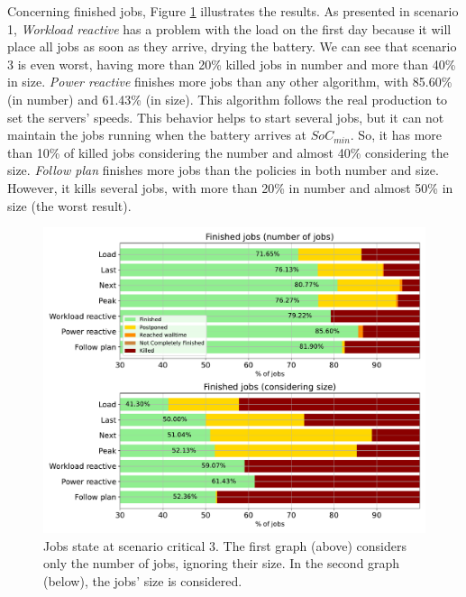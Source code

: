 Concerning finished jobs, Figure \ref{fig:jobs_critical_3} illustrates the results. As presented in scenario 1, \emph{Workload reactive} has a problem with the load on the first day because it will place all jobs as soon as they arrive, drying the battery. We can see that scenario 3 is even worst, having more than 20\% killed jobs in number and more than 40\% in size. \emph{Power reactive} finishes more jobs than any other algorithm, with 85.60\% (in number) and 61.43\% (in size). This algorithm follows the real production to set the servers' speeds. This behavior helps to start several jobs, but it can not maintain the jobs running when the battery arrives at $SoC_{min}$. So, it has more than 10\% of killed jobs considering the number and almost 40\% considering the size. \emph{Follow plan} finishes more jobs than the policies in both number and size. However, it kills several jobs, with more than 20\% in number and almost 50\% in size (the worst result). 

\begin{figure}[!htb]
    \centering
    \includegraphics[scale=0.55]{Images/Compensations/jobs_critical_3.pdf}
    \caption{Jobs state at scenario critical 3. The first graph (above) considers only the number of jobs, ignoring their size. In the second graph (below), the jobs' size is considered.}
    \label{fig:jobs_critical_3}
\end{figure}

